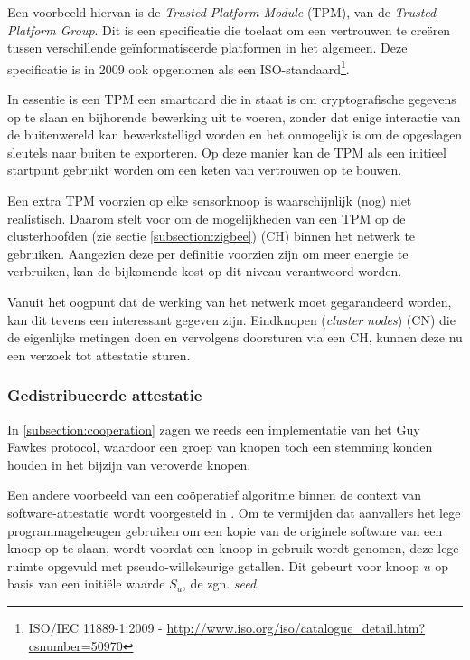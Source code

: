 Een voorbeeld hiervan is de \emph{Trusted Platform Module} (TPM), van de
\emph{Trusted Platform Group}. Dit is een specificatie die toelaat om een
vertrouwen te cre\"eren tussen verschillende ge\"informatiseerde platformen in
het algemeen. Deze specificatie is in 2009 ook opgenomen als een
ISO-standaard\footnote{ISO/IEC 11889-1:2009 -
\url{http://www.iso.org/iso/catalogue_detail.htm?csnumber=50970}}.

In essentie is een TPM een smartcard die in staat is om cryptografische
gegevens op te slaan en bijhorende bewerking uit te voeren, zonder dat enige
interactie van de buitenwereld kan bewerkstelligd worden en het onmogelijk is
om de opgeslagen sleutels naar buiten te exporteren. Op deze manier kan de TPM
als een initieel startpunt gebruikt worden om een keten van vertrouwen op te
bouwen.

Een extra TPM voorzien op elke sensorknoop is waarschijnlijk (nog) niet
realistisch. Daarom stelt \citep{krauss2007detecting} voor om de mogelijkheden
van een TPM op de clusterhoofden (zie sectie \ref{subsection:zigbee}) (CH)
binnen het netwerk te gebruiken. Aangezien deze per definitie voorzien zijn om
meer energie te verbruiken, kan de bijkomende kost op dit niveau verantwoord
worden.

Vanuit het oogpunt dat de werking van het netwerk moet gegarandeerd worden, kan
dit tevens een interessant gegeven zijn. Eindknopen (\emph{cluster nodes}) (CN)
die de eigenlijke metingen doen en vervolgens doorsturen via een CH, kunnen
deze nu een verzoek tot attestatie sturen.

\subsubsection*{Gedistribueerde attestatie}

In \ref{subsection:cooperation} zagen we reeds een implementatie van het Guy
Fawkes protocol, waardoor een groep van knopen toch een stemming konden houden
in het bijzijn van veroverde knopen.

Een andere voorbeeld van een co\"operatief algoritme binnen de context van
software-attestatie wordt voorgesteld in \citep{yang2007distributed}. Om te
vermijden dat aanvallers het lege programmageheugen gebruiken om een kopie van
de originele software van een knoop op te slaan, wordt voordat een knoop in
gebruik wordt genomen, deze lege ruimte opgevuld met pseudo-willekeurige
getallen. Dit gebeurt voor knoop $u$ op basis van een initi\"ele waarde $S_u$,
de zgn. \emph{seed}.


